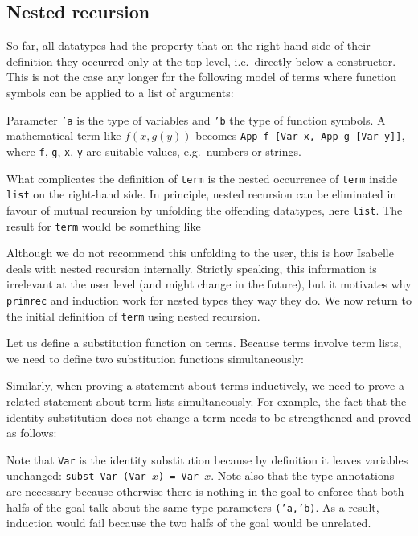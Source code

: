 \subsection{Nested recursion}

So far, all datatypes had the property that on the right-hand side of their
definition they occurred only at the top-level, i.e.\ directly below a
constructor. This is not the case any longer for the following model of terms
where function symbols can be applied to a list of arguments:
\begin{ttbox}
\end{ttbox}
Parameter \texttt{'a} is the type of variables and \texttt{'b} the type of
function symbols.
A mathematical term like $f(x,g(y))$ becomes \texttt{App f [Var x, App g
  [Var y]]}, where \texttt{f}, \texttt{g}, \texttt{x}, \texttt{y} are
suitable values, e.g.\ numbers or strings.

What complicates the definition of \texttt{term} is the nested occurrence of
\texttt{term} inside \texttt{list} on the right-hand side. In principle,
nested recursion can be eliminated in favour of mutual recursion by unfolding
the offending datatypes, here \texttt{list}. The result for \texttt{term}
would be something like
\begin{ttbox}
\end{ttbox}
Although we do not recommend this unfolding to the user, this is how Isabelle
deals with nested recursion internally. Strictly speaking, this information
is irrelevant at the user level (and might change in the future), but it
motivates why \texttt{primrec} and induction work for nested types they way
they do. We now return to the initial definition of \texttt{term} using
nested recursion.

Let us define a substitution function on terms. Because terms involve term
lists, we need to define two substitution functions simultaneously:
\begin{ttbox}


\end{ttbox}
Similarly, when proving a statement about terms inductively, we need
to prove a related statement about term lists simultaneously. For example,
the fact that the identity substitution does not change a term needs to be
strengthened and proved as follows:
\begin{quote}\small

\end{quote}
Note that \texttt{Var} is the identity substitution because by definition it
leaves variables unchanged: \texttt{subst Var (Var $x$) = Var $x$}. Note also
that the type annotations are necessary because otherwise there is nothing in
the goal to enforce that both halfs of the goal talk about the same type
parameters \texttt{('a,'b)}. As a result, induction would fail
because the two halfs of the goal would be unrelated.

